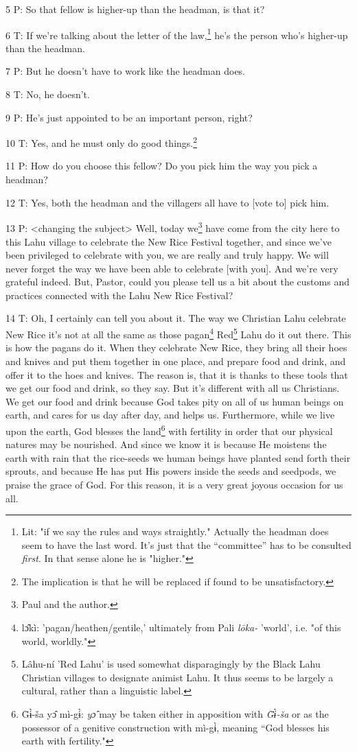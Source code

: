 5 P: So that fellow is higher-up than the headman, is that it?

6 T: If we're talking about the letter of the law,\footnote{Lit: "if we say the rules and ways straightly." Actually the headman does seem to have the last word. It's just that the ``committee'' has to be consulted \textit{first}. In that sense alone he is "higher."} he's the person who's higher-up
than the headman.

7 P: But he doesn't have to work like the headman does.

8 T: No, he doesn't.

9 P: He's just appointed to be an important person, right?

10 T: Yes, and he must only do good things.\footnote{The implication is that he will be replaced if found to be unsatisfactory.}

11 P: How do you choose this fellow? Do you pick him the way you pick a headman?

12 T: Yes, both the headman and the villagers all have to [vote to] pick him.

13 P: <changing the subject> Well, today we\footnote{Paul and the author.} have come from
the city here to this Lahu village to celebrate the New Rice Festival together,
and since we've been privileged to celebrate with you, we are really and truly
happy. We will never forget the way we have been able to celebrate [with you].
And we're very grateful indeed. But, Pastor, could you please tell us a bit about
the customs and practices connected with the Lahu New Rice Festival?

14 T: Oh, I certainly can tell you about it. The way we Christian Lahu celebrate
New Rice it's not at all the same as those pagan\footnote{lɔ̂kì: 'pagan/heathen/gentile,' ultimately from Pali \textit{lōka-} 'world', i.e. "of this world, worldly."} Red\footnote{Lâhu-ní 'Red Lahu' is used somewhat disparagingly by the Black Lahu Christian villages to designate animist Lahu. It thus seems to be largely a cultural, rather than a linguistic label.} Lahu do it out there.
This is how the pagans do it. When they celebrate New Rice, they bring all their
hoes and knives and put them together in one place, and prepare food and drink,
and offer it to the hoes and knives. The reason is, that it is thanks to these
tools that we get our food and drink, so they say. But it's different with all
us Christians. We get our food and drink because God takes pity on all of us human
beings on earth, and cares for us day after day, and helps us. Furthermore, while
we live upon the earth, God blesses the land\footnote{G̈ɨ̀-ša yɔ̂ mì-gɨ̀: \textit{yɔ̂} may be taken either in apposition with \textit{G̈ɨ̀-ša} or as the possessor of a genitive construction with mì-gɨ̀, meaning ``God blesses his earth with fertility."} with fertility in order that our
physical natures may be nourished. And since we know it is because He moistens
the earth with rain that the rice-seeds we human beings have planted send forth
their sprouts, and because He has put His powers inside the seeds and seedpods,
we praise the grace of God. For this reason, it is a very great joyous occasion
for us all.

